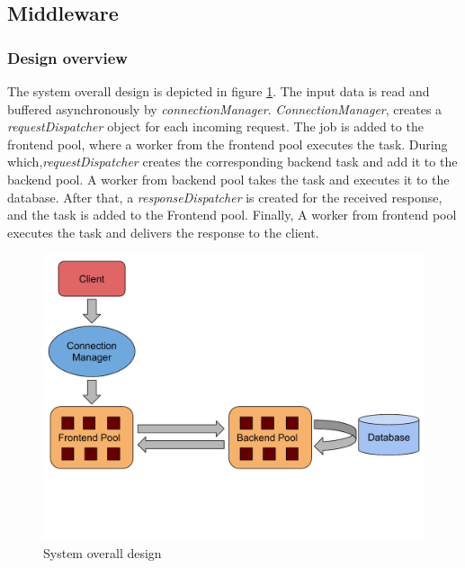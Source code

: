 \documentclass[11pt]{article}
\begin{document}
\subsection{Middleware}\label{sec:middleware}

\subsubsection{Design overview}\label{sec:design-overview}

The system overall design is depicted in figure \ref{fig:system}. The input data is read
and buffered asynchronously by \emph{connectionManager}. \emph{ConnectionManager}, creates a 
\emph{requestDispatcher} object for each incoming request. The job is added to the frontend pool,
where a worker from the frontend pool executes the task. During which,\emph{requestDispatcher}
creates the corresponding backend task and add it to the backend pool. A worker from backend pool
takes the task and executes it to the database. After that, a \emph{responseDispatcher} is 
created for the received response, and the task is added to the Frontend pool. 
Finally, A worker from frontend pool executes the task and delivers the response to the client. 

\begin{figure}[!ht]
  \includegraphics[height=0.35\textheight,page=1]{figures/system}
  \centering
  \caption{System overall design}
  \label{fig:system}
\end{figure}
\end{document}
